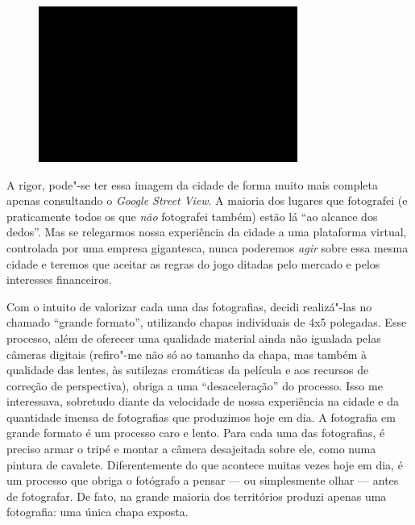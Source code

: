 \begin{figure}[!ht]
\centering
 \includegraphics[width=85mm]{./imgs/im1.jpg}
\caption{\tiny{}}
\end{figure}

A rigor, pode"-se ter essa imagem da cidade de forma muito mais completa
apenas consultando o \emph{Google Street View}. A maioria dos lugares
que fotografei (e praticamente todos os que \emph{não} fotografei
também) estão lá ``ao alcance dos dedos''. Mas se relegarmos nossa
experiência da cidade a uma plataforma virtual, controlada por uma
empresa gigantesca, nunca poderemos \emph{agir} sobre essa mesma cidade
e teremos que aceitar as regras do jogo ditadas pelo mercado e pelos
interesses financeiros.

Com o intuito de valorizar cada uma das fotografias, decidi realizá"-las
no chamado ``grande formato'', utilizando chapas individuais de 4x5
polegadas. Esse processo, além de oferecer uma qualidade material ainda
não igualada pelas câmeras digitais (refiro"-me não só ao tamanho da
chapa, mas também à qualidade das lentes, às sutilezas cromáticas da
película e aos recursos de correção de perspectiva), obriga a uma
``desaceleração'' do processo. Isso me interessava, sobretudo diante da
velocidade de nossa experiência na cidade e da quantidade imensa de
fotografias que produzimos hoje em dia. A fotografia em grande formato é
um processo caro e lento. Para cada uma das fotografias, é preciso armar
o tripé e montar a câmera desajeitada sobre ele, como numa pintura de
cavalete. Diferentemente do que acontece muitas vezes hoje em dia, é um
processo que obriga o fotógrafo a pensar --- ou simplesmente olhar ---
antes de fotografar. De fato, na grande maioria dos territórios produzi
apenas uma fotografia: uma única chapa exposta.

